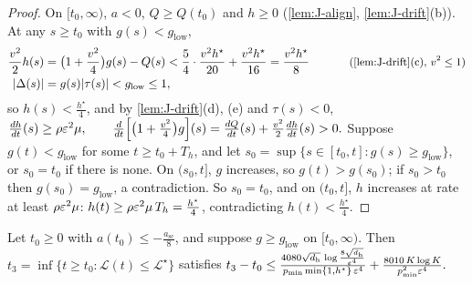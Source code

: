 \begin{proof}
On $[t_0,\infty)$, $a<0$, $Q\ge Q(t_0)$ and $h\ge0$ (\cref{lem:J-align}, \cref{lem:J-drift}(b)). At any $s\ge t_0$ with $g(s)<g_{\mathrm{low}}$,
\begin{alignat*}{2}
 \tfrac{v^2}{2}h(s)&=\bigl(1+\tfrac{v^2}{4}\bigr)g(s)-Q(s)<\tfrac{5}{4}\cdot\tfrac{v^2h^\star}{20}+\tfrac{v^2h^\star}{16}=\tfrac{v^2h^\star}{8} &\qquad& \why{\cref{lem:J-drift}(c), $v^2\le1$}\\
 |\Delta(s)|&=g(s)|\tau(s)|<g_{\mathrm{low}}\le1,
\end{alignat*}
so $h(s)<\frac{h^\star}{4}$, and by \cref{lem:J-drift}(d), (e) and $\tau(s)<0$,
 $\ddt{h}(s)\ge\rho\initscale^2\mu,\qquad \frac{d}{dt}\Bigl[\bigl(1+\tfrac{v^2}{4}\bigr)g\Bigr](s)=\ddt{Q}(s)+\tfrac{v^2}{2}\ddt{h}(s)>0 .$ 
Suppose $g(t)<g_{\mathrm{low}}$ for some $t\ge t_0+T_h$, and let $s_0=\sup\{s\in[t_0,t]:g(s)\ge g_{\mathrm{low}}\}$, or $s_0=t_0$ if there is none. On $(s_0,t]$, $g$
increases, so $g(t)>g(s_0)$; if $s_0>t_0$ then $g(s_0)=g_{\mathrm{low}}$, a contradiction. So $s_0=t_0$, and on $(t_0,t]$, $h$ increases at rate at least
$\rho\varepsilon^2\mu$: $h(t)\ge\rho\varepsilon^2\mu\,T_h=\frac{h^\star}{4}$, contradicting $h(t)<\frac{h^\star}{4}$.
\end{proof}

\begin{lemma}
\label{lem:J-grow}
Let $t_0\ge0$ with $a(t_0)\le-\frac{a_{\mathrm{sc}}}{8}$, and suppose $g\ge g_{\mathrm{low}}$ on $[t_0,\infty)$. Then $t_3=\inf\{t\ge t_0:\mathcal L(t)\le\mathcal L^\star\}$ satisfies
 $t_3-t_0\le\frac{4080\sqrt{d_{\mathrm h}}\,\log\frac{8\sqrt{d_{\mathrm h}}}{\varepsilon^4}}{p_{\min}\min\{1,h^\star\}\,\varepsilon^4}+\frac{8010\,K\log K}{p_{\min}^2\varepsilon^4} .$ 
\end{lemma}

